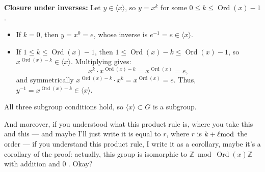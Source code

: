 \begin{proofWrapper}
\begin{content}
\textbf{Closure under inverses:} Let $y \in \langle x \rangle$, so $y = x^k$ for some $0 \le k \le \operatorname{Ord}(x) - 1$.
\begin{itemize}
    \item If $k = 0$, then $y = x^0 = e$, whose inverse is $e^{-1} = e \in \langle x \rangle$.
    \item If $1 \le k \le \operatorname{Ord}(x) - 1$, then $1 \le \operatorname{Ord}(x) - k \le \operatorname{Ord}(x) - 1$, so $x^{\operatorname{Ord}(x)-k} \in \langle x \rangle$. Multiplying gives:
    \[
    x^k \cdot x^{\operatorname{Ord}(x)-k} = x^{\operatorname{Ord}(x)} = e,
    \]
    and symmetrically $x^{\operatorname{Ord}(x)-k} \cdot x^k = x^{\operatorname{Ord}(x)} = e$. Thus, $y^{-1} = x^{\operatorname{Ord}(x)-k} \in \langle x \rangle$.
\end{itemize}
All three subgroup conditions hold, so $\langle x \rangle \subset G$ is a subgroup.
\end{content}
\end{proofWrapper}

\begin{speech}[00:06:34 - 00:07:24]
And moreover, if you understood what this product rule is, where you take this and this --- and maybe I'll just write it is equal to $r$, where $r$ is $k + \ell \bmod$ the order  --- if you understand this product rule, I write it as a corollary, maybe it's a corollary of the proof: actually, this group is isomorphic to $\mathbb{Z} \bmod \operatorname{Ord}(x)\mathbb{Z}$ with addition and $0$ . Okay?
\end{speech}

